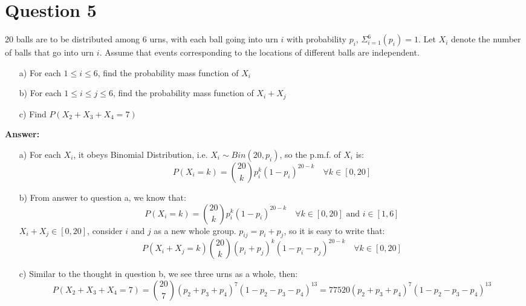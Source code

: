 \documentclass[hidelinks]{article}
\begin{document}
\section{Question 5}
20 balls are to be distributed among 6 urns, with each ball going into urn $i$ with probability $p_i$, $\Sigma^6_{i=1}(p_i) = 1$. Let $X_i$ denote the number of balls that go into urn $i$. Assume that events corresponding to the locations of different balls are independent.
\begin{enumerate}
    \item[a)] For each $1 \leq i \leq 6$, find the probability mass function of $X_i$
    \item[b)] For each $1 \leq i \leq j \leq 6$, find the probability mass function of $X_i + X_j$
    \item[c)]  Find $P(X_2 + X_3 + X_4 = 7)$
\end{enumerate}
\textbf{\large Answer:}
\begin{enumerate}
    \item[a)] For each $X_i$, it obeys Binomial Distribution, i.e. $X_i \sim Bin(20, p_i)$, so the p.m.f. of $X_i$ is:
    $$ P(X_i = k) = \binom{20}{k}p_i^{k}(1-p_i)^{20-k} \quad \forall k \in [0,20]$$
    \item[b)] From answer to question a, we know that:
    $$P(X_i = k) = \binom{20}{k}p_i^{k}(1-p_i)^{20-k} \quad \forall k \in [0,20] \text{ and } i \in [1,6]$$
    $X_i + X_j \in [0,20]$, consider $i$ and $j$ as a new whole group. $p_{ij} = p_i + p_j$, so it is easy to write that:
    $$ P(X_i + X_j = k) \binom{20}{k}(p_i + p_j)^{k}(1-p_i-p_j)^{20-k} \quad \forall k \in [0,20]$$
    \item[c)] Similar to the thought in question b, we see three urns as a whole, then:
    $$ P(X_2 + X_3 + X_4 = 7) = \binom{20}{7}(p_2+p_3+p_4)^{7}(1-p_2-p_3-p_4)^{13} = 77520(p_2+p_3+p_4)^{7}(1-p_2-p_3-p_4)^{13}$$
\end{enumerate}
\end{document}
